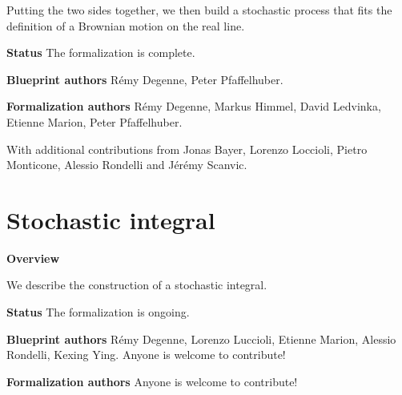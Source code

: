Putting the two sides together, we then build a stochastic process that fits the definition of a Brownian motion on the real line.

\textbf{Status} The formalization is complete.

\textbf{Blueprint authors} Rémy Degenne, Peter Pfaffelhuber.

\textbf{Formalization authors} Rémy Degenne, Markus Himmel, David Ledvinka, Etienne Marion, Peter Pfaffelhuber.

With additional contributions from Jonas Bayer, Lorenzo Loccioli, Pietro Monticone, Alessio Rondelli and Jérémy Scanvic.








\putbib

\part{Stochastic integral}

\textbf{Overview}

We describe the construction of a stochastic integral.

\textbf{Status} The formalization is ongoing.

\textbf{Blueprint authors} Rémy Degenne, Lorenzo Luccioli, Etienne Marion, Alessio Rondelli, Kexing Ying. Anyone is welcome to contribute!

\textbf{Formalization authors} Anyone is welcome to contribute!











\putbib

